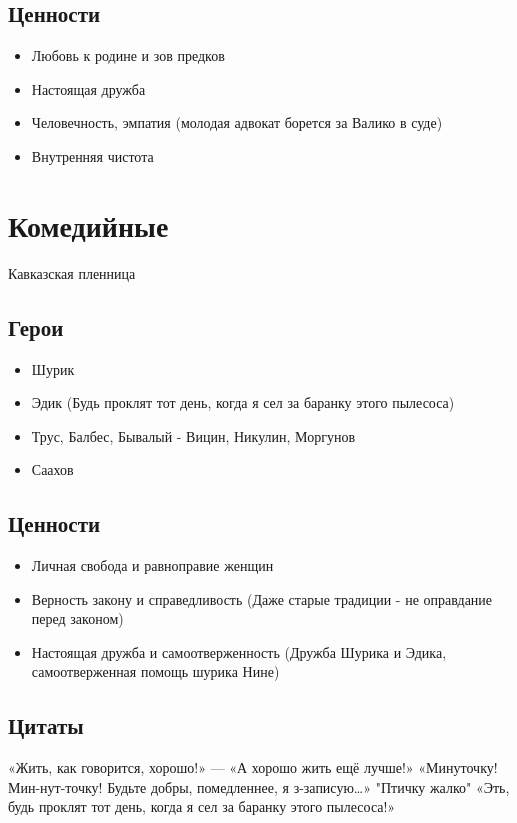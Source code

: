 \documentclass[a4paper,14pt]{article}
\begin{document}
\subsection{Ценности}
\begin{itemize}
    \item Любовь к родине и зов предков
    \item Настоящая дружба
    \item Человечность, эмпатия (молодая адвокат борется за Валико в суде)
    \item Внутренняя чистота
\end{itemize}




\section{Комедийные}
Кавказская пленница

\subsection{Герои}

\begin{itemize}
    \item Шурик
    \item Эдик (Будь проклят тот день, когда я сел за баранку этого пылесоса)
    \item Трус, Балбес, Бывалый - Вицин, Никулин, Моргунов
    \item Саахов
\end{itemize}
\subsection{Ценности}

\begin{itemize}
    \item Личная свобода и равноправие женщин
    \item Верность закону и справедливость (Даже старые традиции - не оправдание перед законом)
    \item Настоящая дружба и самоотверженность (Дружба Шурика и Эдика, самоотверженная помощь шурика Нине)
\end{itemize}

\subsection{Цитаты}
«Жить, как говорится, хорошо!» --- «А хорошо жить ещё лучше!»
«Минуточку! Мин-нут-точку! Будьте добры, помедленнее, я з-записую…»
"Птичку жалко"
«Эть, будь проклят тот день, когда я сел за баранку этого пылесоса!»
\end{document}
